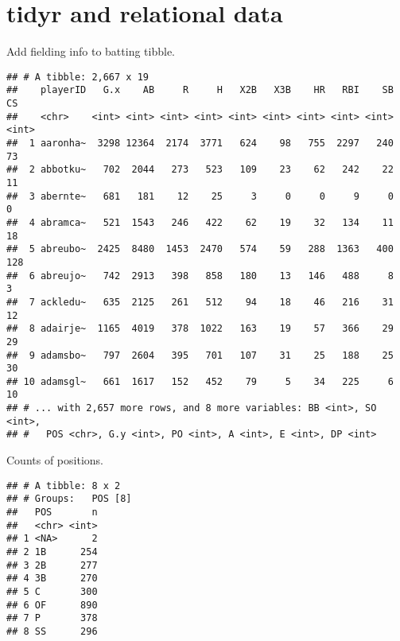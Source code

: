 \documentclass[]{book}
\newenvironment{Shaded}{\begin{snugshade}}{\end{snugshade}}
\newcommand{\KeywordTok}[1]{\textcolor[rgb]{0.13,0.29,0.53}{\textbf{#1}}}
\newcommand{\DataTypeTok}[1]{\textcolor[rgb]{0.13,0.29,0.53}{#1}}
\newcommand{\DecValTok}[1]{\textcolor[rgb]{0.00,0.00,0.81}{#1}}
\newcommand{\StringTok}[1]{\textcolor[rgb]{0.31,0.60,0.02}{#1}}
\newcommand{\OperatorTok}[1]{\textcolor[rgb]{0.81,0.36,0.00}{\textbf{#1}}}
\newcommand{\NormalTok}[1]{#1}
\begin{document}
\section{tidyr and relational data}\label{tidyr-and-relational-data}

Add fielding info to batting tibble.

\begin{Shaded}
\end{Shaded}

\begin{verbatim}
## # A tibble: 2,667 x 19
##    playerID   G.x    AB     R     H   X2B   X3B    HR   RBI    SB    CS
##    <chr>    <int> <int> <int> <int> <int> <int> <int> <int> <int> <int>
##  1 aaronha~  3298 12364  2174  3771   624    98   755  2297   240    73
##  2 abbotku~   702  2044   273   523   109    23    62   242    22    11
##  3 abernte~   681   181    12    25     3     0     0     9     0     0
##  4 abramca~   521  1543   246   422    62    19    32   134    11    18
##  5 abreubo~  2425  8480  1453  2470   574    59   288  1363   400   128
##  6 abreujo~   742  2913   398   858   180    13   146   488     8     3
##  7 ackledu~   635  2125   261   512    94    18    46   216    31    12
##  8 adairje~  1165  4019   378  1022   163    19    57   366    29    29
##  9 adamsbo~   797  2604   395   701   107    31    25   188    25    30
## 10 adamsgl~   661  1617   152   452    79     5    34   225     6    10
## # ... with 2,657 more rows, and 8 more variables: BB <int>, SO <int>,
## #   POS <chr>, G.y <int>, PO <int>, A <int>, E <int>, DP <int>
\end{verbatim}

Counts of positions.

\begin{Shaded}
\end{Shaded}

\begin{verbatim}
## # A tibble: 8 x 2
## # Groups:   POS [8]
##   POS       n
##   <chr> <int>
## 1 <NA>      2
## 2 1B      254
## 3 2B      277
## 4 3B      270
## 5 C       300
## 6 OF      890
## 7 P       378
## 8 SS      296
\end{verbatim}
\end{document}
